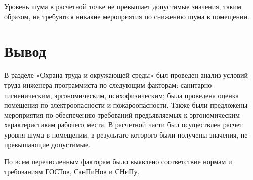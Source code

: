 Уровень шума в расчетной точке не превышает допустимые значения, таким образом, не требуются никакие мероприятия по снижению шума в помещении.
\FloatBarrier

\section{Вывод}
В разделе «Охрана труда и окружающей среды» был проведен анализ условий труда инженера-программиста по следующим факторам: санитарно-гигиеническим, эргономическим, психофизическим; была проведена оценка помещения по электроопасности и пожароопасности. Также были предложены мероприятия по обеспечению требований предъявляемых к эргономическим характеристикам рабочего места. В расчетной части был осуществлен расчет уровня шума в помещении, в результате которого были получены значения, не превышающие допустимые.
 
По всем перечисленным факторам было выявлено соответствие нормам и требованиям ГОСТов, СанПиНов и СНиПу.